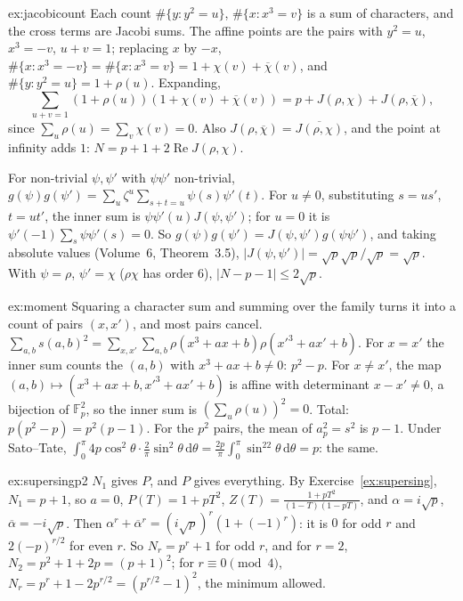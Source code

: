 \begin{solution}{ex:jacobicount}
\idea Each count $\#\{y:y^2=u\}$, $\#\{x:x^3=v\}$ is a sum of characters, and the cross terms are Jacobi sums.
\writeup The affine points are the pairs with $y^2=u$, $x^3=-v$, $u+v=1$; replacing $x$ by $-x$, $\#\{x:x^3=-v\}=\#\{x:x^3=v\}=1+\chi(v)+\overline\chi(v)$, and
$\#\{y:y^2=u\}=1+\rho(u)$. Expanding,
\[
\sum_{u+v=1}(1+\rho(u))(1+\chi(v)+\overline\chi(v))=p+J(\rho,\chi)+J(\rho,\overline\chi),
\]
since $\sum_u\rho(u)=\sum_v\chi(v)=0$. Also $J(\rho,\overline\chi)=\overline{J(\rho,\chi)}$, and the point at infinity adds $1$: $N=p+1+2\operatorname{Re}J(\rho,\chi)$.

For non-trivial $\psi,\psi'$ with $\psi\psi'$ non-trivial, $g(\psi)g(\psi')=\sum_u\zeta^u\sum_{s+t=u}\psi(s)\psi'(t)$. For $u\ne0$, substituting $s=us'$, $t=ut'$, the
inner sum is $\psi\psi'(u)J(\psi,\psi')$; for $u=0$ it is $\psi'(-1)\sum_s\psi\psi'(s)=0$. So $g(\psi)g(\psi')=J(\psi,\psi')g(\psi\psi')$, and taking absolute values
(Volume~6, Theorem~3.5), $|J(\psi,\psi')|=\sqrt p\sqrt p/\sqrt p=\sqrt p$. With $\psi=\rho$, $\psi'=\chi$ ($\rho\chi$ has order $6$), $|N-p-1|\le2\sqrt p$.
\end{solution}

\begin{solution}{ex:moment}
\idea Squaring a character sum and summing over the family turns it into a count of pairs $(x,x')$, and most pairs cancel.
\writeup $\sum_{a,b}s(a,b)^2=\sum_{x,x'}\sum_{a,b}\rho(x^3+ax+b)\rho(x'^3+ax'+b)$. For $x=x'$ the inner sum counts the $(a,b)$ with $x^3+ax+b\ne0$: $p^2-p$. For
$x\ne x'$, the map $(a,b)\mapsto(x^3+ax+b,x'^3+ax'+b)$ is affine with determinant $x-x'\ne0$, a bijection of $\mathbb F_p^2$, so the inner sum is
$(\sum_u\rho(u))^2=0$. Total: $p(p^2-p)=p^2(p-1)$. For the $p^2$ pairs, the mean of $a_p^2=s^2$ is $p-1$. Under Sato--Tate,
$\int_0^\pi4p\cos^2\theta\cdot\frac2\pi\sin^2\theta\,\mathrm d\theta=\frac{2p}\pi\int_0^\pi\sin^22\theta\,\mathrm d\theta=p$: the same.
\end{solution}

\begin{solution}{ex:supersingp2}
\idea $N_1$ gives $P$, and $P$ gives everything.
\writeup By Exercise~\ref{ex:supersing}, $N_1=p+1$, so $a=0$, $P(T)=1+pT^2$, $Z(T)=\frac{1+pT^2}{(1-T)(1-pT)}$, and $\alpha=i\sqrt p$, $\overline\alpha=-i\sqrt p$.
Then $\alpha^r+\overline\alpha^r=(i\sqrt p)^r(1+(-1)^r)$: it is $0$ for odd $r$ and $2(-p)^{r/2}$ for even $r$. So $N_r=p^r+1$ for odd $r$, and for $r=2$,
$N_2=p^2+1+2p=(p+1)^2$; for $r\equiv0\pmod4$, $N_r=p^r+1-2p^{r/2}=(p^{r/2}-1)^2$, the minimum allowed.
\end{solution}

